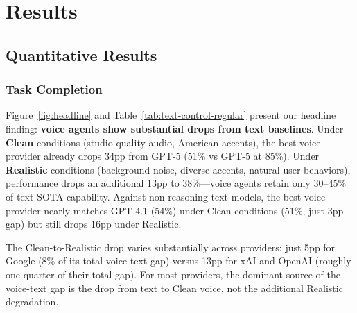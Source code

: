 \section{Results}
\label{sec:results}

\subsection{Quantitative Results}

\subsubsection{Task Completion}

Figure~\ref{fig:headline} and Table~\ref{tab:text-control-regular} present our headline finding: \textbf{voice agents show substantial drops from text baselines}. Under \textbf{Clean} conditions (studio-quality audio, American accents), the best voice provider already drops 34pp from GPT-5 (51\% vs GPT-5 at 85\%). Under \textbf{Realistic} conditions (background noise, diverse accents, natural user behaviors), performance drops an additional 13pp to 38\%---voice agents retain only 30--45\% of text SOTA capability. Against non-reasoning text models, the best voice provider nearly matches GPT-4.1 (54\%) under Clean conditions (51\%, just 3pp gap) but still drops 16pp under Realistic.

\begin{table}[h]
\caption{Text vs Voice comparison (pass@1). Text shows GPT-5 (reasoning) and GPT-4.1 (non-reasoning). Voice evaluated under Clean and Realistic conditions. Deltas show gap from GPT-5.}
\label{tab:text-control-regular}
\centering
\begin{small}
\resizebox{\columnwidth}{!}{%

}
\end{small}
\end{table}

The Clean-to-Realistic drop varies substantially across providers: just 5pp for Google (8\% of its total voice-text gap) versus 13pp for xAI and OpenAI (roughly one-quarter of their total gap). For most providers, the dominant source of the voice-text gap is the drop from text to Clean voice, not the additional Realistic degradation.

